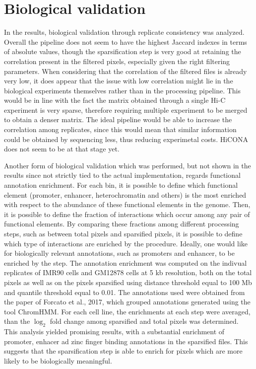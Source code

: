 \section{Biological validation}

In the results, biological validation through replicate consistency was analyzed. Overall the pipeline does not seem to have the highest Jaccard indexes in terms of absolute values, though the sparsification step is very good at retaining the correlation present in the filtered pixels, especially given the right filtering parameters. When considering that the correlation of the filtered files is already very low, it does appear that the issue with low correlation might lie in the biological experiments themselves rather than in the processing pipeline. This would be in line with the fact the matrix obtained through a single Hi-C experiment is very sparse, therefore requiring multiple experiment to be merged to obtain a denser matrix. The ideal pipeline would be able to increase the correlation among replicates, since this would mean that similar information could be obtained by sequencing less, thus reducing experimetal costs. HiCONA does not seem to be at that stage yet.

Another form of biological validation which was performed, but not shown in the results since not strictly tied to the actual implementation, regards functional annotation enrichment. For each bin, it is possible to define which functional element (promoter, enhancer, heterochromatin and others) is the most enriched with respect to the abundance of these functional elements in the genome. Then, it is possible to define the fraction of interactions which occur among any pair of functional elements. By comparing these fractions among different processing steps, such as between total pixels and sparsified pixels, it is possible to define which type of interactions are enriched by the procedure. Ideally, one would like for biologically relevant annotations, such as promoters and enhancer, to be enriched by the step. The annotation enrichment was computed on the indivual replicates of IMR90 cells and GM12878 cells at 5 kb resolution, both on the total pixels as well as on the pixels sparsified using distance threshold equal to 100 Mb and quantile threshold equal to 0.01. The annotations used were obtained from the paper of Forcato et al., 2017\cite{toolcomparison2017}, which grouped annotations generated using the tool ChromHMM\cite{chromhmm2014}. For each cell line, the enrichments at each step were averaged, than the $\log_2$ fold change among sparsified and total pixels was determined. This analysis yielded promising results, with a substantial enrichment of promoter, enhacer ad zinc finger binding annotations in the sparsified files. This suggests that the sparsification step is able to enrich for pixels which are more likely to be biologically meaningful.

